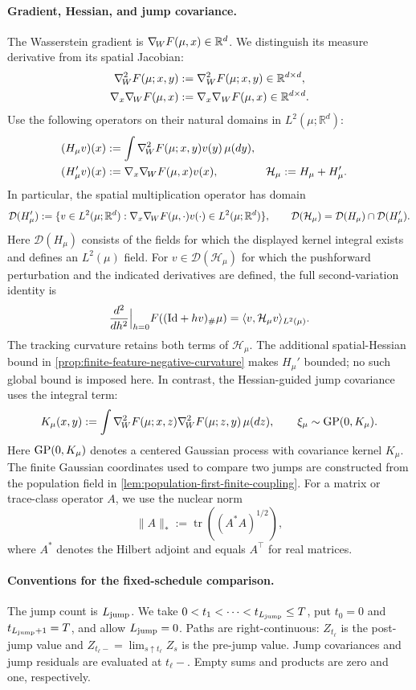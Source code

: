 \paragraph{Gradient, Hessian, and jump covariance.}
The Wasserstein gradient is \(\nabla_{\!W} F(\mu,x)\in\mathbb R^d\).
We distinguish its measure derivative from its spatial Jacobian:
\begin{align*}
 \nabla^{2}_{\!W} F(\mu;x,y)&:=\nabla_W^2F(\mu;x,y)\in\mathbb R^{d\times d},\\
 \nabla_x \nabla_{\!W} F(\mu,x)&:=\nabla_x\nabla_WF(\mu,x)\in\mathbb R^{d\times d}.
\end{align*}
Use the following operators on their natural domains in
\(L^2(\mu;\mathbb R^d)\):
\begin{align*}
 (H_\mu v)(x)&:=\int\nabla^{2}_{\!W} F(\mu;x,y)v(y)\,\mu(dy),\\
 (H_\mu'v)(x)&:=\nabla_x \nabla_{\!W} F(\mu,x)v(x),
 &\mathcal H_\mu&:=H_\mu+H_\mu'.
\end{align*}
In particular, the spatial multiplication operator has domain
\[
 \mathcal D(H_\mu')
 :=\{v\in L^2(\mu;\mathbb R^d):
       \nabla_x \nabla_{\!W} F(\mu,\cdot)v(\cdot)\in L^2(\mu;\mathbb R^d)\},
 \qquad
 \mathcal D(\mathcal H_\mu)=\mathcal D(H_\mu)\cap\mathcal D(H_\mu').
\]
Here \(\mathcal D(H_\mu)\) consists of the fields for which the displayed
kernel integral exists and defines an \(L^2(\mu)\) field.
For $v\in\mathcal D(\mathcal H_\mu)$ for which the pushforward perturbation and
the indicated derivatives are defined, the full second-variation identity is
\[
 \frac{d^2}{dh^2}\Big|_{h=0}F((\mathrm{Id}+hv)_\#\mu)
 =\langle v,\mathcal H_\mu v\rangle_{L^2(\mu)}.
\]
The tracking curvature retains both terms of \(\mathcal H_\mu\).
The additional spatial-Hessian bound in
\cref{prop:finite-feature-negative-curvature} makes \(H_\mu'\) bounded;
no such global bound is imposed here.
In contrast, the Hessian-guided jump covariance uses the integral term:
\[
 K_\mu(x,y):=\int\nabla^{2}_{\!W} F(\mu;x,z)\nabla^{2}_{\!W} F(\mu;z,y)\,\mu(dz),
 \qquad \xi_\mu\sim\mathrm{GP}(0,K_\mu).
\]
Here \(\mathrm{GP}(0,K_\mu)\) denotes a centered Gaussian process with covariance
kernel \(K_\mu\). The finite Gaussian coordinates used to compare two
jumps are constructed from the population field in
\cref{lem:population-first-finite-coupling}.
For a matrix or trace-class operator \(A\), we use the nuclear norm
\[
 \|A\|_*:=\operatorname{tr}((A^*A)^{1/2}),
\]
where \(A^*\) denotes the Hilbert adjoint and equals \(A^\top\) for real matrices.

\paragraph{Conventions for the fixed-schedule comparison.}
The jump count is \(L_{\mathrm{jump}}\). We take
\(0<t_1<\cdots<t_{L_{\mathrm{jump}}}\le T\), put \(t_0=0\) and
\(t_{L_{\mathrm{jump}}+1}=T\), and allow \(L_{\mathrm{jump}}=0\).
Paths are right-continuous: \(Z_{t_\ell}\) is the post-jump value and
\(Z_{t_\ell-}=\lim_{s\uparrow t_\ell}Z_s\) is the pre-jump value.
Jump covariances and jump residuals are evaluated at \(t_\ell-\).
Empty sums and products are zero and one, respectively.

